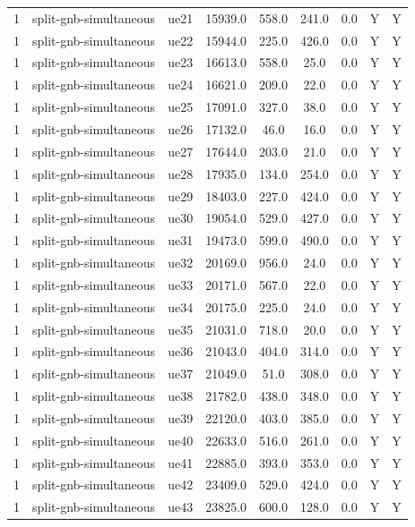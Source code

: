 \begin{table}[ht]
\begin{tabular}{|c|c|c|c|c|c|c|c|c|}
1 & split-gnb-simultaneous & ue21 & 15939.0 & 558.0 & 241.0 & 0.0 & Y & Y \\
1 & split-gnb-simultaneous & ue22 & 15944.0 & 225.0 & 426.0 & 0.0 & Y & Y \\
1 & split-gnb-simultaneous & ue23 & 16613.0 & 558.0 & 25.0 & 0.0 & Y & Y \\
1 & split-gnb-simultaneous & ue24 & 16621.0 & 209.0 & 22.0 & 0.0 & Y & Y \\
1 & split-gnb-simultaneous & ue25 & 17091.0 & 327.0 & 38.0 & 0.0 & Y & Y \\
1 & split-gnb-simultaneous & ue26 & 17132.0 & 46.0 & 16.0 & 0.0 & Y & Y \\
1 & split-gnb-simultaneous & ue27 & 17644.0 & 203.0 & 21.0 & 0.0 & Y & Y \\
1 & split-gnb-simultaneous & ue28 & 17935.0 & 134.0 & 254.0 & 0.0 & Y & Y \\
1 & split-gnb-simultaneous & ue29 & 18403.0 & 227.0 & 424.0 & 0.0 & Y & Y \\
1 & split-gnb-simultaneous & ue30 & 19054.0 & 529.0 & 427.0 & 0.0 & Y & Y \\
1 & split-gnb-simultaneous & ue31 & 19473.0 & 599.0 & 490.0 & 0.0 & Y & Y \\
1 & split-gnb-simultaneous & ue32 & 20169.0 & 956.0 & 24.0 & 0.0 & Y & Y \\
1 & split-gnb-simultaneous & ue33 & 20171.0 & 567.0 & 22.0 & 0.0 & Y & Y \\
1 & split-gnb-simultaneous & ue34 & 20175.0 & 225.0 & 24.0 & 0.0 & Y & Y \\
1 & split-gnb-simultaneous & ue35 & 21031.0 & 718.0 & 20.0 & 0.0 & Y & Y \\
1 & split-gnb-simultaneous & ue36 & 21043.0 & 404.0 & 314.0 & 0.0 & Y & Y \\
1 & split-gnb-simultaneous & ue37 & 21049.0 & 51.0 & 308.0 & 0.0 & Y & Y \\
1 & split-gnb-simultaneous & ue38 & 21782.0 & 438.0 & 348.0 & 0.0 & Y & Y \\
1 & split-gnb-simultaneous & ue39 & 22120.0 & 403.0 & 385.0 & 0.0 & Y & Y \\
1 & split-gnb-simultaneous & ue40 & 22633.0 & 516.0 & 261.0 & 0.0 & Y & Y \\
1 & split-gnb-simultaneous & ue41 & 22885.0 & 393.0 & 353.0 & 0.0 & Y & Y \\
1 & split-gnb-simultaneous & ue42 & 23409.0 & 529.0 & 424.0 & 0.0 & Y & Y \\
1 & split-gnb-simultaneous & ue43 & 23825.0 & 600.0 & 128.0 & 0.0 & Y & Y \\

\end{tabular}
\end{table}
